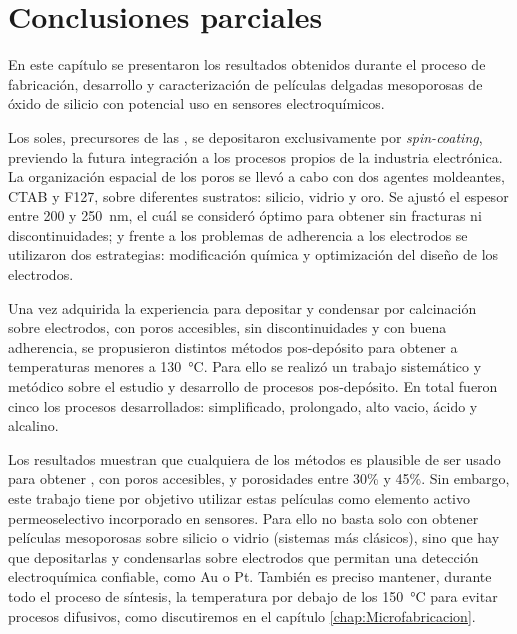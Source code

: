 \section{Conclusiones parciales}
	
	En este capítulo se presentaron los resultados obtenidos durante el proceso de fabricación, desarrollo y caracterización de películas delgadas mesoporosas de óxido de silicio con potencial uso en sensores electroquímicos.
	
	Los soles, precursores de las \pdm, se depositaron exclusivamente por \textit{spin-coating}, previendo la futura integración a los procesos propios de la industria electrónica. La organización espacial de los poros se llevó a cabo con dos agentes moldeantes, CTAB y F127, sobre diferentes sustratos: silicio, vidrio y oro. Se ajustó el espesor entre 200 y \SI{250}{\nm}, el cuál se consideró óptimo para obtener \pdm\space sin fracturas ni discontinuidades; y frente a los problemas de adherencia a los electrodos se utilizaron dos estrategias: modificación química y optimización del diseño de los electrodos. 

	Una vez adquirida la experiencia para depositar y condensar por calcinación \pdm\space sobre electrodos, con poros accesibles, sin discontinuidades y con buena adherencia, se propusieron distintos métodos pos-depósito para obtener \pdm\space a temperaturas menores a \SI{130}{\celsius}. Para ello se realizó un trabajo sistemático y metódico sobre el estudio y desarrollo de procesos pos-depósito. En total fueron cinco los procesos desarrollados: simplificado, prolongado, alto vacio, ácido y alcalino.

	Los resultados muestran que cualquiera de los métodos es plausible de ser usado para obtener \pdm, con poros accesibles, y porosidades entre 30\% y 45\%. Sin embargo, este trabajo tiene por objetivo utilizar estas películas como elemento activo permeoselectivo incorporado en sensores. Para ello no basta solo con obtener películas mesoporosas sobre silicio o vidrio (sistemas más clásicos), sino que hay que depositarlas y condensarlas sobre electrodos que permitan una detección electroquímica confiable, como Au o Pt. También es preciso mantener, durante todo el proceso de síntesis, la temperatura por debajo de los \SI{150}{\celsius} para evitar procesos difusivos, como discutiremos en el capítulo \ref{chap:Microfabricacion}.

